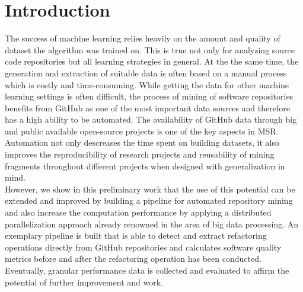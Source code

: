 
\section{Introduction}
\label{sec:intro}
The success of machine learning relies heavily on the amount and quality of dataset the algorithm was trained on. This is true not only for analyzing source code repositories but all learning strategies in general. At the the same time, the generation and extraction of suitable data is often based on a manual process which is costly and time-consuming. While getting the data for other machine learning settings is often difficult, the process of mining of software repositories benefits from GitHub as one of the most important data sources and therefore has a high ability to be automated. The availability of GitHub data through big and public available open-source projects is one of the key aspects in MSR. Automation not only descreases the time spent on building datasets, it also improves the reproducibility of research projects and reusability of mining fragments throughout different projects when designed with generalization in mind.\\
However, we show in this preliminary work that the use of this potential can be extended and improved by building a pipeline for automated repository mining and also increase the computation performance by applying a distributed parallelization approach already renowned in the area of big data processing. An exemplary pipeline is built that is able to detect and extract refactoring operations directly from GitHub repositories and calculates software quality metrics before and after the refactoring operation has been conducted. Eventually,  granular performance data is collected and evaluated to affirm the potential of further improvement and work.